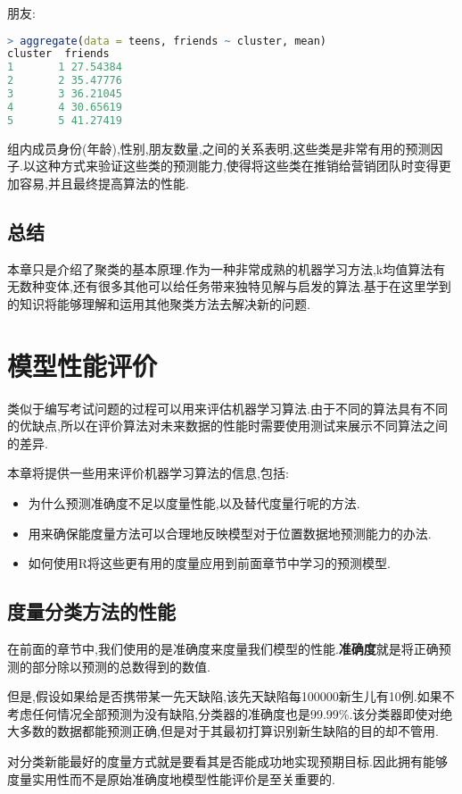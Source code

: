 \documentclass[11pt,a4paper,oneside]{book}
\begin{document}
朋友:
\begin{lstlisting}[language=r]
> aggregate(data = teens, friends ~ cluster, mean)
cluster  friends
1       1 27.54384
2       2 35.47776
3       3 36.21045
4       4 30.65619
5       5 41.27419
\end{lstlisting}

组内成员身份(年龄),性别,朋友数量,之间的关系表明,这些类是非常有用的预测因子.以这种方式来验证这些类的预测能力,使得将这些类在推销给营销团队时变得更加容易,并且最终提高算法的性能.

\section{总结}
本章只是介绍了聚类的基本原理.作为一种非常成熟的机器学习方法,k均值算法有无数种变体,还有很多其他可以给任务带来独特见解与启发的算法.基于在这里学到的知识将能够理解和运用其他聚类方法去解决新的问题.


\chapter{模型性能评价}
类似于编写考试问题的过程可以用来评估机器学习算法.由于不同的算法具有不同的优缺点,所以在评价算法对未来数据的性能时需要使用测试来展示不同算法之间的差异.

本章将提供一些用来评价机器学习算法的信息,包括:
\begin{itemize}
	\item 为什么预测准确度不足以度量性能,以及替代度量行呢的方法.
	\item 用来确保能度量方法可以合理地反映模型对于位置数据地预测能力的办法.
	\item 如何使用R将这些更有用的度量应用到前面章节中学习的预测模型.
\end{itemize}

\section{度量分类方法的性能}
在前面的章节中,我们使用的是准确度来度量我们模型的性能.\textbf{准确度}就是将正确预测的部分除以预测的总数得到的数值.

但是,假设如果给是否携带某一先天缺陷,该先天缺陷每100000新生儿有10例.如果不考虑任何情况全部预测为没有缺陷,分类器的准确度也是99.99\%.该分类器即使对绝大多数的数据都能预测正确,但是对于其最初打算识别新生缺陷的目的却不管用.

对分类新能最好的度量方式就是要看其是否能成功地实现预期目标.因此拥有能够度量实用性而不是原始准确度地模型性能评价是至关重要的.
\end{document}
